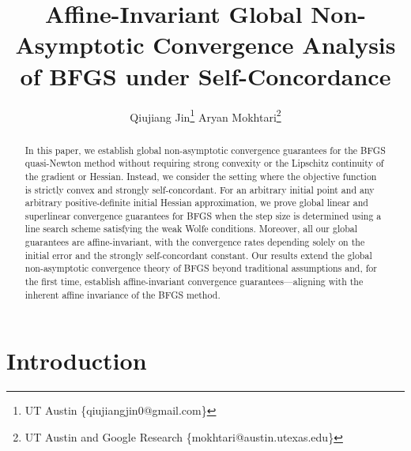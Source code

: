 \documentclass[11pt,letterpaper]{article}
\newcommand\0{{\Vector{0}}}
\newcommand\1{{\Vector{1}}}
\numberwithin{assumption}{section}
\numberwithin{definition}{section}
\numberwithin{theorem}{section}
\numberwithin{remark}{section}
\begin{document}
\title{Affine-Invariant Global Non-Asymptotic Convergence Analysis of BFGS under Self-Concordance}

\author{Qiujiang Jin\thanks{UT Austin  \{qiujiangjin0@gmail.com\}} \qquad Aryan Mokhtari\thanks{UT Austin and Google Research  \{mokhtari@austin.utexas.edu\}}}

\maketitle

\begin{abstract}
In this paper, we establish global non-asymptotic convergence guarantees for the BFGS quasi-Newton method without requiring strong convexity or the Lipschitz continuity of the gradient or Hessian. Instead, we consider the setting where the objective function is strictly convex and strongly self-concordant. For an arbitrary initial point and any arbitrary positive-definite initial Hessian approximation, we prove global linear and superlinear convergence guarantees for BFGS when the step size is determined using a line search scheme satisfying the weak Wolfe conditions.  Moreover, all our global guarantees are affine-invariant, with the convergence rates depending solely on the initial error and the strongly self-concordant constant. Our results extend the global non-asymptotic convergence theory of BFGS beyond traditional assumptions and, for the first time, establish affine-invariant convergence guarantees—aligning with the inherent affine invariance of the BFGS method.
\end{abstract}

\section{Introduction}\label{sec:introduction}
\end{document}
